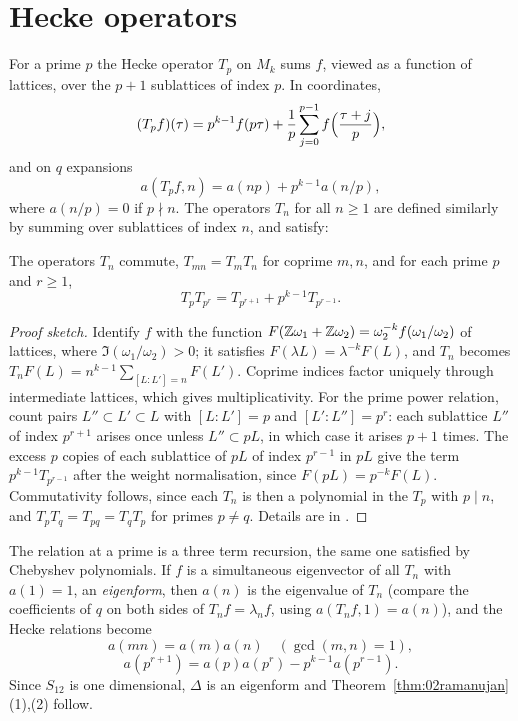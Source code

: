 \section{Hecke operators}
For a prime $p$ the Hecke operator $T_p$ on $M_k$ sums $f$, viewed as a function of lattices, over the $p+1$ sublattices of index $p$. In coordinates,
\[
(T_pf)(\tau)=p^{k-1}f(p\tau)+\frac1p\sum_{j=0}^{p-1}f\Bigl(\frac{\tau+j}{p}\Bigr),
\]
and on $q$ expansions
\[
a(T_pf,n)=a(np)+p^{k-1}a(n/p),
\]
where $a(n/p)=0$ if $p\nmid n$. The operators $T_n$ for all $n\ge1$ are defined similarly by summing over sublattices of index $n$, and satisfy:

\begin{proposition}\label{prop:02hecke}
The operators $T_n$ commute, $T_{mn}=T_mT_n$ for coprime $m,n$, and for each prime $p$ and $r\ge1$,
\[
T_pT_{p^r}=T_{p^{r+1}}+p^{k-1}T_{p^{r-1}}.
\]
\end{proposition}

\begin{proof}[Proof sketch]
Identify $f$ with the function $F(\mathbb{Z}\omega_1+\mathbb{Z}\omega_2)=\omega_2^{-k}f(\omega_1/\omega_2)$ of lattices, where $\Im(\omega_1/\omega_2)>0$; it satisfies $F(\lambda L)=\lambda^{-k}F(L)$, and $T_n$ becomes $T_nF(L)=n^{k-1}\sum_{[L:L']=n}F(L')$. Coprime indices factor uniquely through intermediate lattices, which gives multiplicativity. For the prime power relation, count pairs $L''\subset L'\subset L$ with $[L:L']=p$ and $[L':L'']=p^r$: each sublattice $L''$ of index $p^{r+1}$ arises once unless $L''\subset pL$, in which case it arises $p+1$ times. The excess $p$ copies of each sublattice of $pL$ of index $p^{r-1}$ in $pL$ give the term $p^{k-1}T_{p^{r-1}}$ after the weight normalisation, since $F(pL)=p^{-k}F(L)$. Commutativity follows, since each $T_n$ is then a polynomial in the $T_p$ with $p\mid n$, and $T_pT_q=T_{pq}=T_qT_p$ for primes $p\neq q$. Details are in \cite{serre1973}.
\end{proof}

The relation at a prime is a three term recursion, the same one satisfied by Chebyshev polynomials. If $f$ is a simultaneous eigenvector of all $T_n$ with $a(1)=1$, an \emph{eigenform}, then $a(n)$ is the eigenvalue of $T_n$ (compare the coefficients of $q$ on both sides of $T_nf=\lambda_nf$, using $a(T_nf,1)=a(n)$), and the Hecke relations become
\[
a(mn)=a(m)a(n)\quad(\gcd(m,n)=1),
\]
\[
a(p^{r+1})=a(p)a(p^r)-p^{k-1}a(p^{r-1}).
\]
Since $S_{12}$ is one dimensional, $\Delta$ is an eigenform and Theorem~\ref{thm:02ramanujan}(1),(2) follow.

